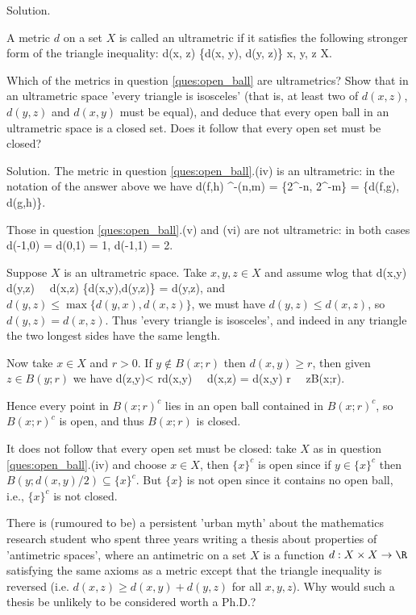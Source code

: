Solution. 

\begin{exercise}
A metric $d$ on a set $X$ is called an ultrametric if it satisfies the following stronger form of the triangle inequality:
\be
d(x, z) \leq \max \{d(x, y), d(y, z)\} x, y, z \in X.
\ee

Which of the metrics in question \ref{ques:open_ball} are ultrametrics? Show that in an ultrametric space 'every triangle is isosceles' (that is, at least two of $d(x, z)$, $d(y, z)$ and $d(x, y)$ must be equal), and deduce that every open ball in an ultrametric space is a closed set. Does it follow that every open set must be closed?
\end{exercise}

Solution. The metric in question \ref{ques:open_ball}.(iv) is an ultrametric: in the notation of the answer above we have
\be
d(f,h) ^{-\min(n,m)} = \max\{2^{-n}, 2^{-m}\} = \max\{d(f,g), d(g,h)\}.
\ee

Those in question \ref{ques:open_ball}.(v) and (vi) are not ultrametric: in both cases 
\be
d(-1,0) = d(0,1) = 1, \quad d(-1,1) = 2.
\ee

Suppose $X$ is an ultrametric space. Take $x,y,z\in X$ and assume wlog that 
\be
d(x,y) \leq d(y,z) \ \ra \ d(x,z) \leq \max\{d(x,y),d(y,z)\} = d(y,z),
\ee
and $d(y,z) \leq \max\{d(y,x),d(x,z)\}$, we must have $d(y,z) \leq d(x,z)$, so $d(y,z) = d(x,z)$. Thus 'every triangle is isosceles', and indeed in any triangle the two longest sides have the same length. 

Now take $x\in X$ and $r>0$. If $y \notin B(x;r)$ then $d(x,y)\geq r$, then given $z\in B(y;r)$ we have
\be
d(z,y)< r\leq d(x,y) \ \ra \ d(x,z) = d(x,y) \geq r  \ \ra \ z\notin B(x;r).
\ee

Hence every point in $B(x;r)^c$ lies in an open ball contained in $B(x;r)^c$, so $B(x;r)^c$ is open, and thus $B(x;r)$ is closed.

It does not follow that every open set must be closed: take $X$ as in question \ref{ques:open_ball}.(iv) and choose $x\in X$, then $\{x\}^c$ is open since if $y\in \{x\}^c$ then $B(y;d(x,y)/2) \subseteq \{x\}^c$. But $\{x\}$ is not open since it contains no open ball, i.e., $\{x\}^c$ is not closed.

\begin{exercise}
There is (rumoured to be) a persistent 'urban myth' about the mathematics research student who spent three years writing a thesis about properties of 'antimetric spaces', where an antimetric on a set $X$ is a function $d : X \times X \to \R$ satisfying the same axioms as a metric except that the triangle inequality is reversed (i.e. $d(x, z) \geq d(x, y) + d(y, z)$ for all $x,y,z$). Why would such a thesis be unlikely to be considered worth a Ph.D.?
\end{exercise}

